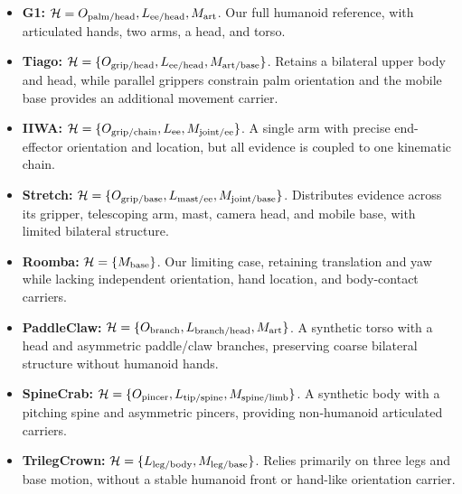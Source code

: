 \documentclass[letterpaper,10pt,conference]{ieeeconf}
\begin{document}
\begin{itemize}
\item \textbf{G1:} $\mathcal{H}={O_{\rm palm/head},L_{\rm ee/head},M_{\rm art}}$. Our full humanoid reference, with articulated hands, two arms, a head, and torso.

\item \textbf{Tiago:} $\mathcal{H}=\{O_{\rm grip/head},L_{\rm ee/head},M_{\rm art/base}\}$. Retains a bilateral upper body and head, while parallel grippers constrain palm orientation and the mobile base provides an additional movement carrier.

\item \textbf{IIWA:} $\mathcal{H}=\{O_{\rm grip/chain},L_{\rm ee},M_{\rm joint/ee}\}$. A single arm with precise end-effector orientation and location, but all evidence is coupled to one kinematic chain.

\item \textbf{Stretch:} $\mathcal{H}=\{O_{\rm grip/base},L_{\rm mast/ee},M_{\rm joint/base}\}$. Distributes evidence across its gripper, telescoping arm, mast, camera head, and mobile base, with limited bilateral structure.

\item \textbf{Roomba:} $\mathcal{H}=\{M_{\rm base}\}$. Our limiting case, retaining translation and yaw while lacking independent orientation, hand location, and body-contact carriers.


\item \textbf{PaddleClaw:} $\mathcal{H}=\{O_{\rm branch},L_{\rm branch/head},M_{\rm art}\}$. A synthetic torso with a head and asymmetric paddle/claw branches, preserving coarse bilateral structure without humanoid hands.

\item \textbf{SpineCrab:} $\mathcal{H}=\{O_{\rm pincer},L_{\rm tip/spine},M_{\rm spine/limb}\}$. A synthetic body with a pitching spine and asymmetric pincers, providing non-humanoid articulated carriers.

\item \textbf{TrilegCrown:} $\mathcal{H}=\{L_{\rm leg/body},M_{\rm leg/base}\}$. Relies primarily on three legs and base motion, without a stable humanoid front or hand-like orientation carrier.

\end{itemize}
\end{document}
